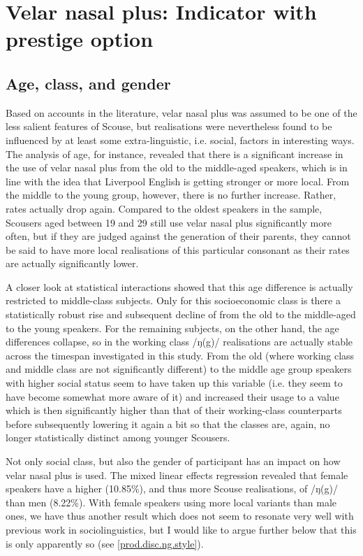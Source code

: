 \section{Velar nasal plus: Indicator with prestige option}
\label{prod.disc.ng}

\subsection{Age, class, and gender}
\label{prod.disc.ng.social}

Based on accounts in the literature, velar nasal plus was assumed to be one of the less salient features of Scouse, but realisations were nevertheless found to be influenced by at least some extra-linguistic, i.e. social, factors in interesting ways.
The analysis of age, for instance, revealed that there is a significant increase in the use of velar nasal plus from the old to the middle-aged speakers, which is in line with the idea that Liverpool English is getting stronger or more local.
From the middle to the young group, however, there is no further increase.
Rather,  rates actually drop again.
Compared to the oldest speakers in the sample, Scousers aged between 19 and 29 still use velar nasal plus significantly more often, but if they are judged against the generation of their parents, they cannot be said to have more local realisations of this particular consonant as their rates are actually significantly lower.

A closer look at statistical interactions showed that this age difference is actually restricted to middle-class subjects.
Only for this socioeconomic class is there a statistically robust rise and subsequent decline of  from the old to the middle-aged to the young speakers.
For the remaining subjects, on the other hand, the age differences collapse, so in the working class /ŋ(g)/ realisations are actually stable across the timespan investigated in this study.
From the old (where working class and middle class are not significantly different) to the middle age group speakers with higher social status seem to have taken up this variable (i.e. they seem to have become somewhat more aware of it) and increased their usage to a value which is then significantly higher than that of their working-class counterparts before subsequently lowering it again a bit so that the classes are, again, no longer statistically distinct among younger Scousers.

Not only social class, but also the gender of participant has an impact on how velar nasal plus is used.
The mixed linear effects regression revealed that female speakers have a higher  (10.85\%), and thus more Scouse realisations, of /ŋ(g)/ than men (8.22\%).
With female speakers using more local variants than male ones, we have thus another result which does not seem to resonate very well with previous work in sociolinguistics, but I would like to argue further below that this is only apparently so (see \ref{prod.disc.ng.style}).

